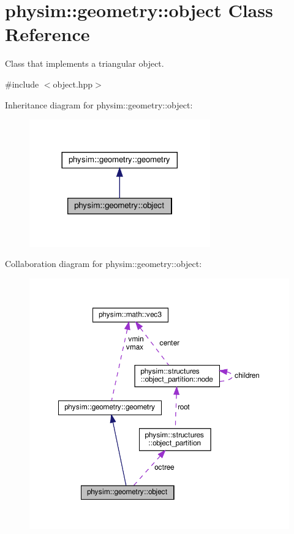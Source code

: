 \hypertarget{classphysim_1_1geometry_1_1object}{}\section{physim\+:\+:geometry\+:\+:object Class Reference}
\label{classphysim_1_1geometry_1_1object}


Class that implements a triangular object.  




{\ttfamily \#include $<$object.\+hpp$>$}



Inheritance diagram for physim\+:\+:geometry\+:\+:object\+:\nopagebreak
\begin{figure}[H]
\begin{center}
\leavevmode
\includegraphics[width=221pt]{classphysim_1_1geometry_1_1object__inherit__graph}
\end{center}
\end{figure}


Collaboration diagram for physim\+:\+:geometry\+:\+:object\+:
\nopagebreak
\begin{figure}[H]
\begin{center}
\leavevmode
\includegraphics[width=350pt]{classphysim_1_1geometry_1_1object__coll__graph}
\end{center}
\end{figure}
